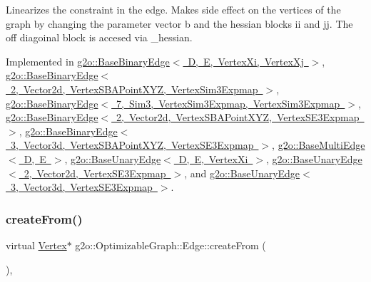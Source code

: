 Linearizes the constraint in the edge. Makes side effect on the vertices of the graph by changing the parameter vector b and the hessian blocks ii and jj. The off diagoinal block is accesed via \+\_\+hessian. 

Implemented in \mbox{\hyperlink{classg2o_1_1_base_binary_edge_a06a18745d95017c6d3c841f838a65364}{g2o\+::\+Base\+Binary\+Edge$<$ D, E, Vertex\+Xi, Vertex\+Xj $>$}}, \mbox{\hyperlink{classg2o_1_1_base_binary_edge_a06a18745d95017c6d3c841f838a65364}{g2o\+::\+Base\+Binary\+Edge$<$ 2, Vector2d, Vertex\+S\+B\+A\+Point\+X\+Y\+Z, Vertex\+Sim3\+Expmap $>$}}, \mbox{\hyperlink{classg2o_1_1_base_binary_edge_a06a18745d95017c6d3c841f838a65364}{g2o\+::\+Base\+Binary\+Edge$<$ 7, Sim3, Vertex\+Sim3\+Expmap, Vertex\+Sim3\+Expmap $>$}}, \mbox{\hyperlink{classg2o_1_1_base_binary_edge_a06a18745d95017c6d3c841f838a65364}{g2o\+::\+Base\+Binary\+Edge$<$ 2, Vector2d, Vertex\+S\+B\+A\+Point\+X\+Y\+Z, Vertex\+S\+E3\+Expmap $>$}}, \mbox{\hyperlink{classg2o_1_1_base_binary_edge_a06a18745d95017c6d3c841f838a65364}{g2o\+::\+Base\+Binary\+Edge$<$ 3, Vector3d, Vertex\+S\+B\+A\+Point\+X\+Y\+Z, Vertex\+S\+E3\+Expmap $>$}}, \mbox{\hyperlink{classg2o_1_1_base_multi_edge_ae44ba0385d4dda4bc038d81e50cadd8c}{g2o\+::\+Base\+Multi\+Edge$<$ D, E $>$}}, \mbox{\hyperlink{classg2o_1_1_base_unary_edge_ad7e6dc44c571be159f066bdb961ade2b}{g2o\+::\+Base\+Unary\+Edge$<$ D, E, Vertex\+Xi $>$}}, \mbox{\hyperlink{classg2o_1_1_base_unary_edge_ad7e6dc44c571be159f066bdb961ade2b}{g2o\+::\+Base\+Unary\+Edge$<$ 2, Vector2d, Vertex\+S\+E3\+Expmap $>$}}, and \mbox{\hyperlink{classg2o_1_1_base_unary_edge_ad7e6dc44c571be159f066bdb961ade2b}{g2o\+::\+Base\+Unary\+Edge$<$ 3, Vector3d, Vertex\+S\+E3\+Expmap $>$}}.

\mbox{\label{classg2o_1_1_optimizable_graph_1_1_edge_abd98d7a174df25bcc82cfdacba682fec}} 
\subsubsection{\texorpdfstring{create\+From()}{createFrom()}}
{\footnotesize\ttfamily virtual \mbox{\hyperlink{classg2o_1_1_optimizable_graph_1_1_vertex}{Vertex}}$\ast$ g2o\+::\+Optimizable\+Graph\+::\+Edge\+::create\+From (\begin{DoxyParamCaption}{ }\end{DoxyParamCaption})\hspace{0.3cm}{\ttfamily [inline]}, {\ttfamily [virtual]}}



